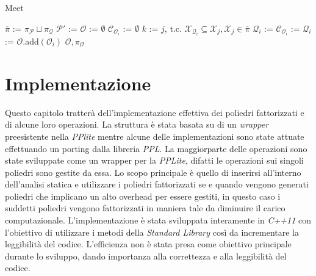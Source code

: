 \documentclass{mimosis}
\theoremstyle{definition}
\begin{document}
\begin{algorithm}[H]
\caption{Meet}\label{meet}
\begin{algorithmic}[1]
\State $\overline{\pi}$ := $\pi_{\mathcal{P}} \sqcup \pi_{\mathcal{Q}}$
\State $\mathcal{P}'$ := 
\State $\mathcal{O}$ := $\emptyset$
\State $\mathcal{C}_{\mathcal{O}_i}$ := $\emptyset$
\State $k$ := $j$, t.c. $\mathcal{X}_{\mathcal{Q}_i} \subseteq \mathcal{X}_j, \mathcal{X}_j \in \overline{\pi}$
\State $\mathcal{Q}_i$ := 
\Else
\State $\mathcal{C}_{\mathcal{O}_i}$ := 
\State $\mathcal{Q}_i$ := 
\EndIf
\State $\mathcal{O}$.add$(\mathcal{O}_i)$
\EndFor
\State\Return $\mathcal{O}, \pi_{\mathcal{O}}$
\EndFunction
\end{algorithmic}
\end{algorithm}



\chapter{Implementazione}
\label{sec:org36c49dd}
Questo capitolo tratterà dell'implementazione effettiva dei poliedri
fattorizzati e di alcune loro operazioni. La struttura è stata basata su di un
\emph{wrapper} preesistente nella \emph{PPlite} mentre alcune delle implementazioni sono
state attuate effettuando un porting dalla libreria \emph{PPL}. La maggiorparte delle
operazioni sono state sviluppate come un wrapper per la \emph{PPLite}, difatti le
operazioni sui singoli poliedri sono gestite da essa. Lo scopo principale è
quello di inserirsi all'interno dell'analisi statica e utilizzare i poliedri
fattorizzati se e quando vengono generati poliedri che implicano un alto
overhead per essere gestiti, in questo caso i suddetti poliedri vengono
fattorizzati in maniera tale da diminuire il carico computazionale.
L'implementazione è stata sviluppata interamente in \emph{C++11} con l'obiettivo di
utilizzare i metodi della \emph{Standard Library} così da incrementare la leggibilità
del codice. L'efficienza non è stata presa come obiettivo principale durante lo
sviluppo, dando importanza alla correttezza e alla leggibilità del codice.
\end{document}
